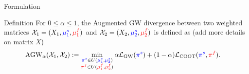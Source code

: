 \documentclass{beamer}
\newcommand{\gw}{\text{GW}}
\newcommand{\coot}{\text{COOT}}
\newcommand{\agw}{\text{AGW}}
\newcommand{\cX}{\mathcal X}
\newcommand{\cL}{\mathcal L}
\newcommand{\pis}{{\color{blue}{\pi^s}}}
\newcommand{\pif}{{\color{red}{\pi^f}}}
\newcommand{\mfsrc}{{\color{red}{\mu_1^f}}}
\newcommand{\mftg}{{\color{red}{\mu_2^f}}}
\newcommand{\mssrc}{{\color{blue}{\mu_1^s}}}
\newcommand{\mstg}{{\color{blue}{\mu_2^s}}}
\begin{document}
\begin{frame}{Formulation}
\scriptsize
\begin{block}{Definition}
  For $0\leq \alpha \leq 1$, the Augmented GW divergence between
  two weighted matrices $\cX_1 = (X_1, \mssrc, \mfsrc)$ and
  $\cX_2 = (X_2, \mstg, \mftg)$ is defined as (add more details on matrix $X$)
  \begin{align*}
    \label{eq:scootr}
    \agw_{\alpha}(\cX_1, \cX_2) &:=
    \min_{\substack{\pis \in U(\mssrc,\mstg) \\ \pif \in U(\mfsrc,\mftg)}}
    \alpha \cL_{\gw}(\pis) + (1-\alpha) \cL_{\coot}(\pis, \pif).
  \end{align*}
\end{block}



\end{frame}
\end{document}
